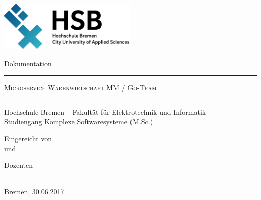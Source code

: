 \begin{titlepage}
\begin{center}

{
\setlength{\parskip}{0pt}

\vspace{5cm}

 	\includegraphics[width=0.50\textwidth]{./pics/hs-logo.png}

\vspace{3cm}

  
Dokumentation


\vspace{0.75cm}


{\hrule height 1pt} 


\vspace{0.5cm}

  
{\large{\textsc{Microservice Warenwirtschaft MM / Go-Team}}} 	  


\vspace{0.5cm}


{\hrule height 1pt}


 \vspace{0.75cm}


Hochschule Bremen -- Fakultät für Elektrotechnik und Informatik \\
Studiengang Komplexe Softwaresysteme (M.Sc.)

\vspace{3cm}


Eingereicht von\\
 und \\

\vspace{1cm}

Dozenten\\
\\

\vspace{3cm}

Bremen, 30.06.2017




}

\end{center}
\end{titlepage}
